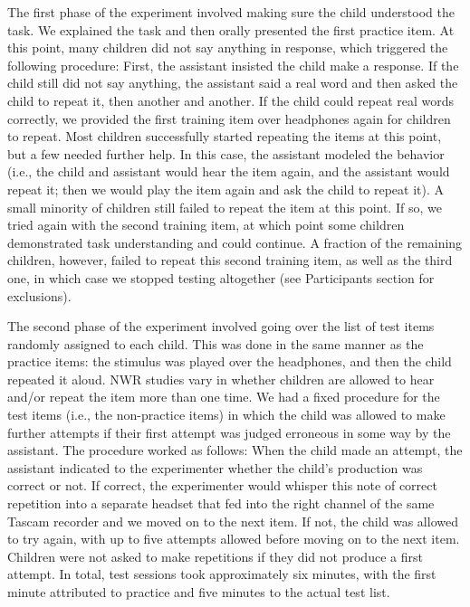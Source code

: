 \documentclass[english,,man,floatsintext]{apa6}
\begin{document}
The first phase of the experiment involved making sure the child understood the task. We explained the task and then orally presented the first practice item. At this point, many children did not say anything in response, which triggered the following procedure: First, the assistant insisted the child make a response. If the child still did not say anything, the assistant said a real word and then asked the child to repeat it, then another and another. If the child could repeat real words correctly, we provided the first training item over headphones again for children to repeat. Most children successfully started repeating the items at this point, but a few needed further help. In this case, the assistant modeled the behavior (i.e., the child and assistant would hear the item again, and the assistant would repeat it; then we would play the item again and ask the child to repeat it). A small minority of children still failed to repeat the item at this point. If so, we tried again with the second training item, at which point some children demonstrated task understanding and could continue. A fraction of the remaining children, however, failed to repeat this second training item, as well as the third one, in which case we stopped testing altogether (see Participants section for exclusions).

The second phase of the experiment involved going over the list of test items randomly assigned to each child. This was done in the same manner as the practice items: the stimulus was played over the headphones, and then the child repeated it aloud. NWR studies vary in whether children are allowed to hear and/or repeat the item more than one time. We had a fixed procedure for the test items (i.e., the non-practice items) in which the child was allowed to make further attempts if their first attempt was judged erroneous in some way by the assistant. The procedure worked as follows: When the child made an attempt, the assistant indicated to the experimenter whether the child's production was correct or not. If correct, the experimenter would whisper this note of correct repetition into a separate headset that fed into the right channel of the same Tascam recorder and we moved on to the next item. If not, the child was allowed to try again, with up to five attempts allowed before moving on to the next item. Children were not asked to make repetitions if they did not produce a first attempt. In total, test sessions took approximately six minutes, with the first minute attributed to practice and five minutes to the actual test list.
\end{document}

